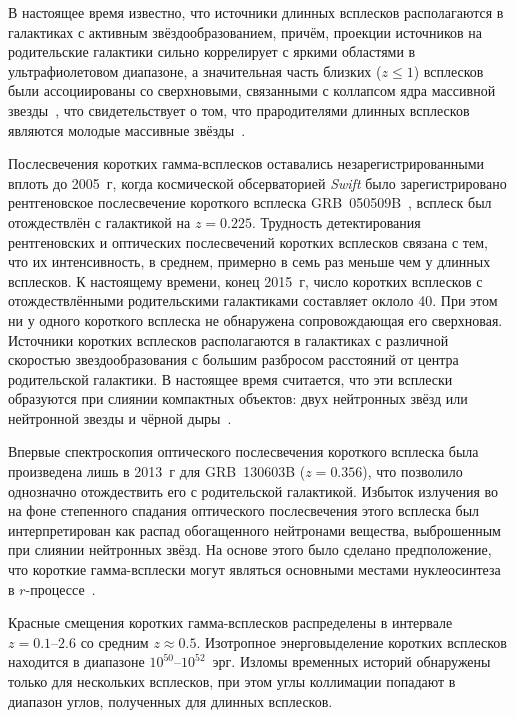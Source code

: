 В настоящее время известно, что источники длинных всплесков располагаются в галактиках 
с активным звёздообразованием, причём, проекции источников на родительские галактики сильно
коррелирует с яркими областями в ультрафиолетовом диапазоне, а значительная часть 
близких ($z \le 1$) всплесков были ассоциированы со сверхновыми, связанными с 
коллапсом ядра массивной звезды~\citep{Hjorth_and_Bloom_2012in_book},
что свидетельствует о том, что прародителями длинных всплесков являются молодые 
массивные звёзды~\citep[см. обзор][]{Berger_2014ARAA}.

Послесвечения коротких гамма-всплесков оставались незарегистрированными вплоть 
до 2005~г, когда космической обсерваторией \textit{Swift} было зарегистрировано 
рентгеновское послесвечение короткого всплеска GRB~050509B~\citep{Gehrels_2005Natur},
всплеск был отождествлён с галактикой на $z=0.225$. 
Трудность детектирования рентгеновских и оптических послесвечений коротких всплесков 
связана с тем, что их интенсивность, в среднем, примерно в семь раз меньше чем у длинных всплесков.
К настоящему времени, конец 2015~г, число коротких всплесков с отождествлёнными 
родительскими галактиками составляет оклоло 40. 
При этом ни у одного короткого всплеска не обнаружена сопровождающая его сверхновая.
Источники коротких всплесков располагаются в галактиках с различной скоростью 
звездообразования с большим разбросом расстояний от центра родительской галактики. 
В настоящее время считается, что эти всплески образуются при слиянии компактных 
объектов: двух нейтронных звёзд или нейтронной звезды и чёрной дыры~\citep[см. обзор][]{Berger_2014ARAA}.

Впервые спектроскопия оптического послесвечения короткого всплеска была произведена 
лишь в 2013~г для GRB~130603B ($z = 0.356$), что позволило однозначно отождествить его 
с родительской галактикой. Избыток излучения во на фоне степенного спадания оптического 
послесвечения этого всплеска был интерпретирован как распад обогащенного 
нейтронами вещества, выброшенным при слиянии нейтронных звёзд. На основе этого 
было сделано предположение, что короткие гамма-всплески могут являться основными местами нуклеосинтеза в 
$r$-процессе~\citep{Tanvir_2013Natur}.
 
Красные смещения коротких гамма-всплесков распределены в интервале $z=0.1\mbox{--}2.6$ 
со средним $z\approx 0.5$.
Изотропное энерговыделение коротких всплесков находится в диапазоне $10^{50}$--$10^{52}$~эрг.
Изломы временных историй обнаружены только для нескольких всплесков, при этом углы коллимации 
попадают в диапазон углов, полученных для длинных всплесков. 

